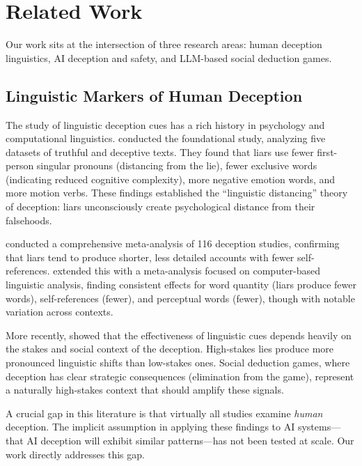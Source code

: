 \section{Related Work}
\label{sec:related}

Our work sits at the intersection of three research areas: human deception linguistics, AI deception and safety, and LLM-based social deduction games.

\subsection{Linguistic Markers of Human Deception}

The study of linguistic deception cues has a rich history in psychology and computational linguistics. \citet{newman2003lying} conducted the foundational study, analyzing five datasets of truthful and deceptive texts. They found that liars use fewer first-person singular pronouns (distancing from the lie), fewer exclusive words (indicating reduced cognitive complexity), more negative emotion words, and more motion verbs. These findings established the ``linguistic distancing'' theory of deception: liars unconsciously create psychological distance from their falsehoods.

\citet{depaulo2003cues} conducted a comprehensive meta-analysis of 116 deception studies, confirming that liars tend to produce shorter, less detailed accounts with fewer self-references. \citet{hauch2015computers} extended this with a meta-analysis focused on computer-based linguistic analysis, finding consistent effects for word quantity (liars produce fewer words), self-references (fewer), and perceptual words (fewer), though with notable variation across contexts.

More recently, \citet{perez2015experiments} showed that the effectiveness of linguistic cues depends heavily on the stakes and social context of the deception. High-stakes lies produce more pronounced linguistic shifts than low-stakes ones. Social deduction games, where deception has clear strategic consequences (elimination from the game), represent a naturally high-stakes context that should amplify these signals.

A crucial gap in this literature is that virtually all studies examine \emph{human} deception. The implicit assumption in applying these findings to AI systems---that AI deception will exhibit similar patterns---has not been tested at scale. Our work directly addresses this gap.

